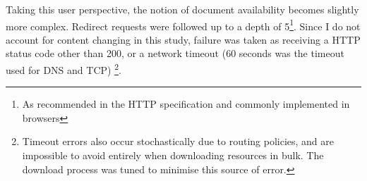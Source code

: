 

Taking this user perspective, the notion of document availability becomes slightly more complex.  Redirect requests were followed up to a depth of 5\footnote{As recommended in the HTTP specification and commonly implemented in browsers}.  Since I do not account for content changing in this study, failure was taken as receiving a HTTP status code other than 200, or a network timeout (60 seconds was the timeout used for DNS and TCP)%
\footnote{Timeout errors also occur stochastically due to routing policies, and are impossible to avoid entirely when downloading resources in bulk.  The download process was tuned to minimise this source of error.}.





